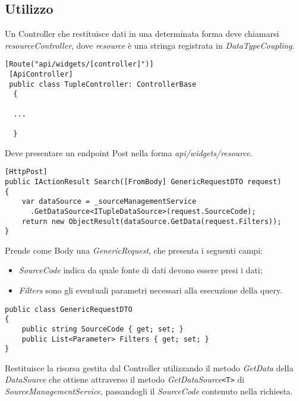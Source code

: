 \subsection{Utilizzo}
Un Controller che restituisce dati in una determinata forma deve chiamarsi \textit{{resource}Controller}, dove \textit{resource} è una stringa registrata in \textit{DataTypeCoupling}.
\begin{lstlisting}[caption={TupleController.cs}, style=sharpCode]
 [Route("api/widgets/[controller]")]
 [ApiController]
 public class TupleController: ControllerBase
  {
  
  ...
  
  }
\end{lstlisting}
Deve presentare un endpoint Post nella forma \textit{api/widgets/{resource}}.
\begin{lstlisting}[caption={TupleController.cs}, style=sharpCode]
[HttpPost]
public IActionResult Search([FromBody] GenericRequestDTO request)
{
    var dataSource = _sourceManagementService
      .GetDataSource<ITupleDataSource>(request.SourceCode);
    return new ObjectResult(dataSource.GetData(request.Filters));
}
\end{lstlisting}
Prende come Body una \textit{GenericRequest}, che presenta i seguenti campi:
\begin{itemize}
\item \textit{SourceCode} indica da quale fonte di dati devono essere presi i dati;
\item \textit{Filters} sono gli eventuali parametri necessari alla esecuzione della query.
\end{itemize}
\begin{lstlisting}[caption={GenericRequestDTO.cs}, style=sharpCode]
public class GenericRequestDTO
{
    public string SourceCode { get; set; }
    public List<Parameter> Filters { get; set; }
}
\end{lstlisting}
Restituisce la risorsa gestita dal Controller utilizzando il metodo \textit{GetData} della \textit{DataSource} che ottiene attraverso il metodo \textit{GetDataSource}\verb|<T>| di \textit{SourceManagementService}, passandogli il \textit{SourceCode} contenuto nella richiesta.